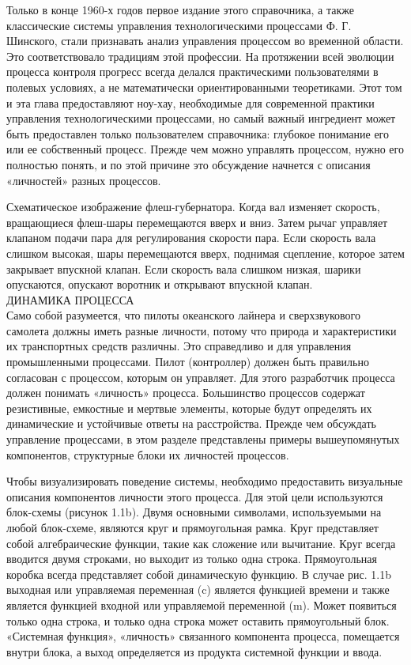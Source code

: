 \documentclass[aps,
12pt,
final,
oneside,
onecolumn,
musixtex, 
superscriptaddress,
centertags]{article}
\begin{document}
Только в конце 1960-х годов первое издание этого справочника, а также классические системы управления технологическими процессами Ф. Г. Шинского, стали признавать анализ управления процессом во временной области. Это соответствовало традициям этой профессии. На протяжении всей эволюции процесса контроля прогресс всегда делался практическими пользователями в полевых условиях, а не математически ориентированными теоретиками. Этот том и эта глава предоставляют ноу-хау, необходимые для современной практики управления технологическими процессами, но самый важный ингредиент может быть предоставлен только пользователем справочника: глубокое понимание его или ее собственный процесс. Прежде чем можно управлять процессом, нужно его полностью понять, и по этой причине это обсуждение начнется с описания «личностей» разных процессов.

Схематическое изображение флеш-губернатора. Когда вал изменяет скорость, вращающиеся флеш-шары перемещаются вверх и вниз. Затем рычаг управляет клапаном подачи пара для регулирования скорости пара. Если скорость вала слишком высокая, шары перемещаются вверх, поднимая сцепление, которое затем закрывает впускной клапан. Если скорость вала слишком низкая, шарики опускаются, опускают воротник и открывают впускной клапан.\\


ДИНАМИКА ПРОЦЕССА \\
  
Само собой разумеется, что пилоты океанского лайнера и сверхзвукового самолета должны иметь разные личности, потому что природа и характеристики их транспортных средств различны. Это справедливо и для управления промышленными процессами. Пилот (контроллер) должен быть правильно согласован с процессом, которым он управляет. Для этого разработчик процесса должен понимать «личность» процесса. Большинство процессов содержат резистивные, емкостные и мертвые элементы, которые будут определять их динамические и устойчивые ответы на расстройства. Прежде чем обсуждать управление процессами, в этом разделе представлены примеры вышеупомянутых компонентов, структурные блоки их личностей процессов.

Чтобы визуализировать поведение системы, необходимо предоставить визуальные описания компонентов личности этого процесса. Для этой цели используются блок-схемы (рисунок 1.1b). Двумя основными символами, используемыми на любой блок-схеме, являются круг и прямоугольная рамка. Круг представляет собой алгебраические функции, такие как сложение или вычитание. Круг всегда вводится двумя строками, но выходит из
только одна строка. Прямоугольная коробка всегда представляет собой динамическую функцию. В случае рис. 1.1b выходная или управляемая переменная (c) является функцией времени и также является функцией входной или управляемой переменной (m). Может появиться только одна строка, и только одна строка может оставить прямоугольный блок. «Системная функция», «личность» связанного компонента процесса, помещается внутри блока, а выход определяется из продукта системной функции и ввода.
\end{document}
